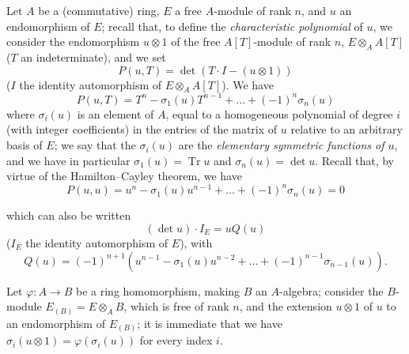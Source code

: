 \begin{env}[6.4.1]
\label{II.6.4.1}
Let $A$ be a (commutative) ring, $E$ a free $A$-module of rank $n$, and $u$
an endomorphism of $E$; recall that, to define the \emph{characteristic
polynomial} of $u$, we consider the endomorphism $u\otimes1$ of the free
$A[T]$-module of rank $n$, $E\otimes_AA[T]$ ($T$ an indeterminate), and we
set
\[
\label{II.6.4.1.1}
P(u,T)=\det(T\cdot I-(u\otimes1))
\tag{6.4.1.1}
\]
($I$ the identity automorphism of $E\otimes_AA[T]$). We have
\[
\label{II.6.4.1.2}
P(u,T)=T^n-\sigma_1(u)T^{n-1}+\ldots+(-1)^n\sigma_n(u)
\tag{6.4.1.2}
\]
where $\sigma_i(u)$ is an element of $A$, equal to a homogeneous polynomial
of degree $i$ (with integer coefficients) in the entries of the matrix of
$u$ relative to an arbitrary basis of $E$; we say that the $\sigma_i(u)$ are
the \emph{elementary symmetric functions of $u$}, and we have in particular
$\sigma_1(u)=\operatorname{Tr}u$ and $\sigma_n(u)=\det u$. Recall that, by
virtue of the Hamilton--Cayley theorem, we have
\[
\label{II.6.4.1.3}
P(u,u)=u^n-\sigma_1(u)u^{n-1}+\ldots+(-1)^n\sigma_n(u)=0
\tag{6.4.1.3}
\]


which can also be written
\[
\label{II.6.4.1.4}
(\det u)\cdot I_E=uQ(u)
\tag{6.4.1.4}
\]
($I_E$ the identity automorphism of $E$), with
\[
\label{II.6.4.1.5}
Q(u)=(-1)^{n+1}(u^{n-1}-\sigma_1(u)u^{n-2}+\ldots+(-1)^{n-1}\sigma_{n-1}(u)).
\tag{6.4.1.5}
\]

Let $\varphi:A\to B$ be a ring homomorphism, making $B$ an $A$-algebra;
consider the $B$-module $E_{(B)}=E\otimes_AB$, which is free of rank $n$,
and the extension $u\otimes1$ of $u$ to an endomorphism of $E_{(B)}$; it is
immediate that we have $\sigma_i(u\otimes1)=\varphi(\sigma_i(u))$ for every
index $i$.
\end{env}

